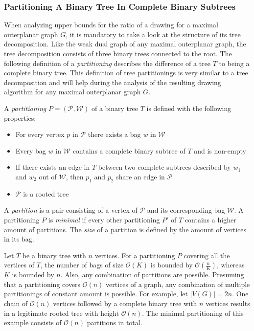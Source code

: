 \subsubsection{Partitioning A Binary Tree In Complete Binary Subtrees}
When analyzing upper bounds for the ratio of a drawing for a maximal outerplanar graph $G$, it is mandatory to take a look at the structure of its tree decomposition. Like the weak dual graph of any maximal outerplanar graph, the tree decomposition consists of three binary trees connected to the root. The following definition of a \emph{partitioning} describes the difference of a tree $T$ to being a complete binary tree. This definition of tree partitionings is very similar to a tree decomposition and will help during the analysis of the resulting drawing algorithm for any maximal outerplanar graph $G$.
\begin{definition}
	A \emph{partitioning} $P = (\mathcal{P},\mathcal{W})$ of a binary tree $T$ is defined with the following properties:
	\begin{itemize}
		\item For every vertex $p$ in $\mathcal{P}$ there exists a bag $w$ in $\mathcal{W}$
		\item Every bag $w$ in $\mathcal{W}$ contains a complete binary subtree of $T$ and is non-empty
		\item If there exists an edge in $T$ between two complete subtrees described by $w_1$ and $w_2$ out of $\mathcal{W}$, then $p_1$ and $p_2$ share an edge in $\mathcal{P}$
		\item $\mathcal{P}$ is a rooted tree		
	\end{itemize}
	A \emph{partition} is a pair consisting of a vertex of $\mathcal{P}$ and its corresponding bag $\mathcal{W}$. A partitioning $P$ is \emph{minimal} if every other partitioning $P'$ of $T$ contains a higher amount of partitions. The \emph{size} of a partition is defined by the amount of vertices in its bag.
\end{definition}
Let $T$ be a binary tree with $n$ vertices. For a partitioning $P$ covering all the vertices of $T$, the number of bags of size $\mathcal{O}(K)$ is bounded by $\mathcal{O}(\frac{n}{K})$, whereas $K$ is bounded by $n$. Also, any combination of partitions are possible. Presuming that a partitioning covers $\mathcal{O}(n)$ vertices of a graph, any combination of multiple partitionings of constant amount is possible. For example, let $|V(G)| = 2n$. One chain of $\mathcal{O}(n)$ vertices followed by a complete binary tree with $n$ vertices results in a legitimate rooted tree with height $\mathcal{O}(n)$. The minimal partitioning of this example consists of $\mathcal{O}(n)$ partitions in total.
